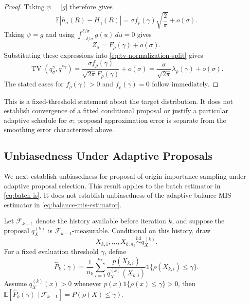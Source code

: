 \begin{proof}
Taking $\psi=|g|$ therefore gives
\[
    \mathbb E
    \left|
        h_\sigma(R)-H_\gamma(R)
    \right|
    =
    \sigma f_\rho(\gamma)
    \sqrt{\frac{2}{\pi}}
    +
    o(\sigma).
\]
Taking $\psi=g$ and using $\int_{-\delta/\sigma}^{\delta/\sigma}g(u)\,du=0$ gives
\[
    Z_\sigma
    =
    F_\rho(\gamma)
    +
    o(\sigma).
\]
Substituting these expressions into \eqref{eq:tv-normalization-split} gives
\[
    \operatorname{TV}
    \left(
        q_\sigma^\gamma,
        q^{*\gamma}
    \right)
    =
    \frac{\sigma f_\rho(\gamma)}
         {\sqrt{2\pi}F_\rho(\gamma)}
    +
    o(\sigma)
    =
    \frac{\sigma}{\sqrt{2\pi}}
    \lambda_\rho(\gamma)
    +
    o(\sigma).
\]
The stated cases for $f_\rho(\gamma)>0$ and $f_\rho(\gamma)=0$ follow immediately.
\end{proof}

This is a fixed-threshold statement about the target distribution. It does not establish convergence of a fitted conditional proposal or justify a particular adaptive schedule for $\sigma$; proposal approximation error is separate from the smoothing error characterized above.

\subsection{Unbiasedness Under Adaptive Proposals}
\label{app:adaptive-unbiasedness}

We next establish unbiasedness for proposal-of-origin importance sampling under adaptive proposal selection. This result applies to the batch estimator in \cref{eq:batch-is}. It does not establish unbiasedness of the adaptive balance-MIS estimator in \cref{eq:balance-mis-estimator}.

Let $\mathcal F_{k-1}$ denote the history available before iteration $k$, and suppose the proposal $q_X^{(k)}$ is $\mathcal F_{k-1}$-measurable. Conditional on this history, draw
\[
    X_{k,1},\ldots,X_{k,n_k}
    \overset{\mathrm{iid}}{\sim}
    q_X^{(k)}.
\]
For a fixed evaluation threshold $\gamma$, define
\[
    \widehat P_k(\gamma)
    =
    \frac{1}{n_k}
    \sum_{i=1}^{n_k}
    \frac{
        p(X_{k,i})
    }{
        q_X^{(k)}(X_{k,i})
    }
    \mathds{1}\{
        \rho(X_{k,i})\leq\gamma
    \}.
\]
Assume $q_X^{(k)}(x)>0$ whenever $p(x)\mathds{1}\{\rho(x)\leq\gamma\}>0$, then $\mathbb E[\widehat P_k(\gamma)\mid\mathcal F_{k-1}]=P(\rho(X)\leq\gamma).$
\vspace{0.3cm}

